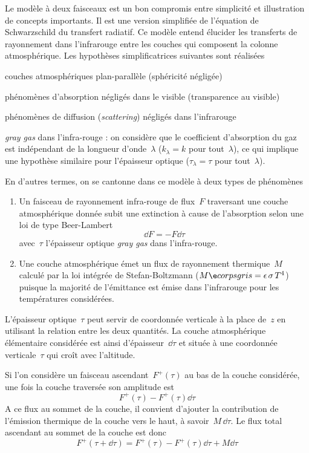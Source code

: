 \sk
Le modèle à deux faisceaux est un bon compromis entre simplicité
et illustration de concepts importants. Il est une version simplifiée
de l'équation de Schwarzschild du transfert radiatif.
Ce modèle entend élucider
les transferts de rayonnement dans l'infrarouge entre
les couches qui composent la colonne atmosphérique. Les
hypothèses simplificatrices suivantes sont réalisées
\begin{citemize}
\item couches atmosphériques plan-parallèle (sphéricité négligée)
\item phénomènes d'absorption négligés dans le visible (transparence au visible)
\item phénomènes de diffusion (\emph{scattering}) négligés dans l'infrarouge
\item \emph{gray gas} dans l'infra-rouge : on considère que le coefficient d'absorption
du gaz est indépendant de la longueur d'onde~$\lambda$ ($k_{\lambda} = k$ pour tout~$\lambda$),
ce qui implique une hypothèse similaire pour l'épaisseur optique ($\tau_{\lambda} = \tau$ pour tout~$\lambda$).
\end{citemize}
En d'autres termes, on se cantonne dans ce modèle à deux types de phénomènes
\begin{enumerate}
\item Un faisceau de rayonnement infra-rouge de flux~$F$ traversant une couche 
atmosphérique donnée
subit une extinction à cause de l'absorption selon une loi de type Beer-Lambert
\[
\dd F = - F \dd \tau
\]
avec~$\tau$ l'épaisseur optique \emph{gray gas} 
dans l'infra-rouge.
\item Une couche atmosphérique émet un flux de rayonnement thermique~$M$ 
calculé par la loi intégrée de Stefan-Boltzmann ($\SB$)
puisque la majorité de l'émittance est émise dans l'infrarouge pour les températures considérées.
\end{enumerate}

\sk
L'épaisseur optique~$\tau$ peut servir de coordonnée verticale à la place de~$z$
en utilisant la relation entre les deux quantités. La couche atmosphérique
élémentaire considérée est ainsi d'épaisseur~$\dd\tau$ et située à une coordonnée
verticale~$\tau$ qui croît avec l'altitude. 

\sk
Si l'on considère un faisceau ascendant~$F^+(\tau)$ au bas de la couche considérée,
une fois la couche traversée son amplitude est
\[
F^+(\tau) - F^+(\tau) \dd\tau
\]
A ce flux au sommet de la couche, il convient d'ajouter
la contribution de l'émission thermique de la couche vers 
le haut, à savoir~$M\,\dd\tau$.
Le flux total ascendant au sommet de la couche est donc
\[
F^+(\tau+\dd\tau) = F^+(\tau) - F^+(\tau) \dd\tau + M\dd\tau
\]


